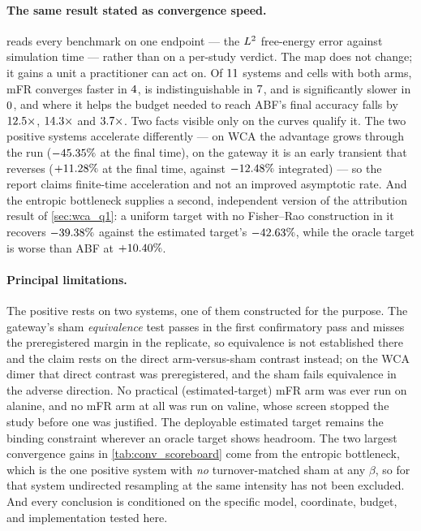 \paragraph{The same result stated as convergence speed.}
 reads every benchmark on one endpoint --- the $L^2$ free-energy error
against simulation time --- rather than on a per-study verdict. The map does not change; it
gains a unit a practitioner can act on. Of $11$ systems and cells with both arms, mFR
converges faster in $4$, is indistinguishable in $7$, and is significantly
slower in $0$, and where it helps the budget needed to reach ABF's final accuracy
falls by $12.5\times$, $14.3\times$ and $3.7\times$.
Two facts visible only on the curves qualify it. The two positive systems accelerate
differently --- on WCA the advantage grows through the run ($-45.35\%$ at the final time),
on the gateway it is an early transient that reverses ($+11.28\%$ at the final time,
against $-12.48\%$ integrated) --- so the report claims finite-time acceleration and not an
improved asymptotic rate. And the entropic bottleneck supplies a second, independent version
of the attribution result of \cref{sec:wca_q1}: a uniform target with no Fisher--Rao
construction in it recovers $-39.38\%$ against the estimated target's $-42.63\%$, while
the oracle target is worse than ABF at $+10.40\%$.

\paragraph{Principal limitations.}
The positive rests on two systems, one of them constructed for the purpose. The gateway's
sham \emph{equivalence} test passes in the first confirmatory pass and misses the
preregistered margin in the replicate, so equivalence is not established there and the claim
rests on the direct arm-versus-sham contrast instead; on the WCA dimer that direct contrast
was preregistered, and the sham fails equivalence in the adverse direction. No practical
(estimated-target) mFR arm was ever run on alanine, and no mFR arm at all was run on valine,
whose screen stopped the study before one was justified. The deployable estimated target
remains the binding constraint wherever an oracle target shows headroom. The two largest
convergence gains in \cref{tab:conv_scoreboard} come from the entropic bottleneck, which is
the one positive system with \emph{no} turnover-matched sham at any $\beta$, so for that
system undirected resampling at the same intensity has not been excluded. And every conclusion
is conditioned on the specific model, coordinate, budget, and implementation tested here.


